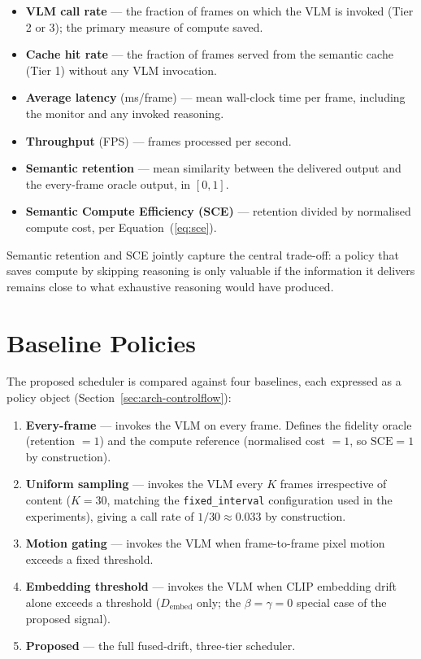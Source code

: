 \begin{itemize}
  \item \textbf{VLM call rate} --- the fraction of frames on which the VLM is
  invoked (Tier 2 or 3); the primary measure of compute saved.
  \item \textbf{Cache hit rate} --- the fraction of frames served from the
  semantic cache (Tier 1) without any VLM invocation.
  \item \textbf{Average latency} (ms/frame) --- mean wall-clock time per frame,
  including the monitor and any invoked reasoning.
  \item \textbf{Throughput} (FPS) --- frames processed per second.
  \item \textbf{Semantic retention} --- mean similarity between the delivered
  output and the every-frame oracle output, in $[0,1]$.
  \item \textbf{Semantic Compute Efficiency (SCE)} --- retention divided by
  normalised compute cost, per Equation~(\ref{eq:sce}).
\end{itemize}

Semantic retention and SCE jointly capture the central trade-off: a policy
that saves compute by skipping reasoning is only valuable if the information
it delivers remains close to what exhaustive reasoning would have produced.

\section{Baseline Policies}
\label{sec:exp-baselines}

The proposed scheduler is compared against four baselines, each expressed as a
policy object (Section~\ref{sec:arch-controlflow}):

\begin{enumerate}
  \item \textbf{Every-frame} --- invokes the VLM on every frame. Defines the
  fidelity oracle (retention $=1$) and the compute reference (normalised cost
  $=1$, so $\mathrm{SCE}=1$ by construction).
  \item \textbf{Uniform sampling} --- invokes the VLM every $K$ frames
  irrespective of content ($K=30$, matching the \texttt{fixed\_interval}
  configuration used in the experiments), giving a call rate of $1/30 \approx
  0.033$ by construction.
  \item \textbf{Motion gating} --- invokes the VLM when frame-to-frame pixel
  motion exceeds a fixed threshold.
  \item \textbf{Embedding threshold} --- invokes the VLM when CLIP embedding
  drift alone exceeds a threshold ($D_{\text{embed}}$ only; the
  $\beta=\gamma=0$ special case of the proposed signal).
  \item \textbf{Proposed} --- the full fused-drift, three-tier scheduler.
\end{enumerate}

